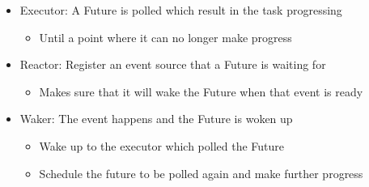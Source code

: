 \begin{frame}[fragile]
\begin{columns}
        \begin{column}{.6\textwidth}
            \begin{itemize}
                \item {\color{red}Executor}: A Future is polled which result in the task progressing
                \begin{itemize}
                    \item Until a point where it can no longer make progress
                \end{itemize}
            \pause
                \item {\color{red}Reactor}: Register an event source that a Future is waiting for
                \begin{itemize}
                    \item Makes sure that it will wake the Future when that event is ready
                \end{itemize}
            \pause
                \item {\color{red}Waker}: The event happens and the Future is woken up
                \begin{itemize}
                    \item Wake up to the executor which polled the Future
                    \item Schedule the future to be polled again and make further progress
                \end{itemize}
            \end{itemize}
            
        \end{column}
    \end{columns}
\end{frame}
